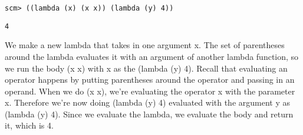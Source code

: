 \begin{blocksection}
\begin{lstlisting}
scm> ((lambda (x) (x x)) (lambda (y) 4))
\end{lstlisting}
\begin{solution}[0.25in]
\begin{lstlisting}
4
\end{lstlisting}
We make a new lambda that takes in one argument x. The set of parentheses around the lambda evaluates it with an argument of another lambda function, so we run the body (x x) with x as the (lambda (y) 4). Recall that evaluating an operator happens by putting parentheses around the operator and passing in an operand. When we do (x x), we’re evaluating the operator x with the parameter x. Therefore we’re now doing (lambda (y) 4) evaluated with the argument y as (lambda (y) 4). Since we evaluate the lambda, we evaluate the body and return it, which is 4. 
\end{solution}
\end{blocksection}
